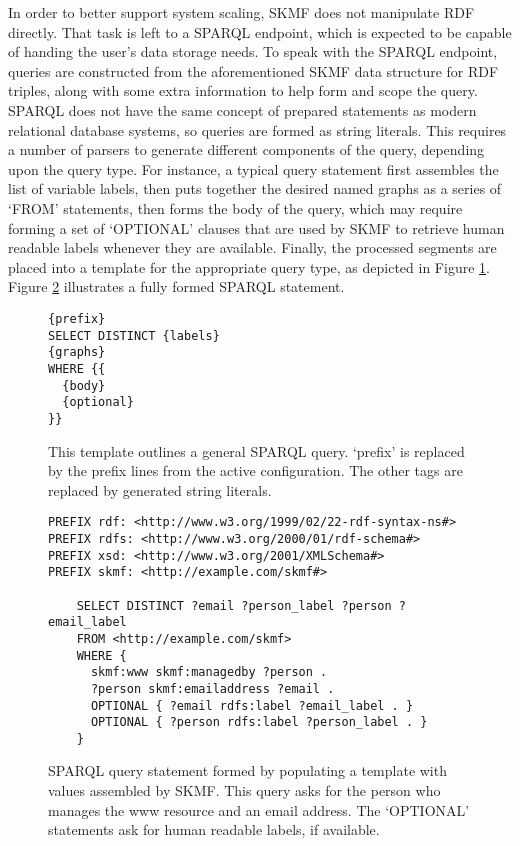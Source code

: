 In order to better support system scaling, SKMF does not manipulate RDF directly. That task is left to a SPARQL endpoint, which is expected to be capable of handing the user's data storage needs. To speak with the SPARQL endpoint, queries are constructed from the aforementioned SKMF data structure for RDF triples, along with some extra information to help form and scope the query. SPARQL does not have the same concept of prepared statements as modern relational database systems, so queries are formed as string literals. This requires a number of parsers to generate different components of the query, depending upon the query type. For instance, a typical query statement first assembles the list of variable labels, then puts together the desired named graphs as a series of `FROM' statements, then forms the body of the query, which may require forming a set of `OPTIONAL' clauses that are used by SKMF to retrieve human readable labels whenever they are available. Finally, the processed segments are placed into a template for the appropriate query type, as depicted in Figure
\ref{sparql-template}.
Figure
\ref{sparql-statement}
illustrates a fully formed SPARQL statement.

\begin{figure}[p]
\singlespace
\begin{verbatim}
{prefix}
SELECT DISTINCT {labels}
{graphs}
WHERE {{
  {body}
  {optional}
}}
\end{verbatim}
\caption[Template for SPARQL query statements]
 {\narrower This template outlines a general SPARQL query. `prefix' is replaced by the prefix lines from the active configuration. The other tags are replaced by generated string literals.
 }
\label{sparql-template}
\end{figure}

\begin{figure}[p]
\singlespace
\begin{verbatim}
PREFIX rdf: <http://www.w3.org/1999/02/22-rdf-syntax-ns#>
PREFIX rdfs: <http://www.w3.org/2000/01/rdf-schema#>
PREFIX xsd: <http://www.w3.org/2001/XMLSchema#>
PREFIX skmf: <http://example.com/skmf#>

    SELECT DISTINCT ?email ?person_label ?person ?email_label
    FROM <http://example.com/skmf>
    WHERE {
      skmf:www skmf:managedby ?person .
      ?person skmf:emailaddress ?email .
      OPTIONAL { ?email rdfs:label ?email_label . }
      OPTIONAL { ?person rdfs:label ?person_label . }
    }
\end{verbatim}
\caption[Generated SPARQL query statement]
 {\narrower SPARQL query statement formed by populating a template with values assembled by SKMF. This query asks for the person who manages the www resource and an email address. The `OPTIONAL' statements ask for human readable labels, if available.
 }
\label{sparql-statement}
\end{figure}


